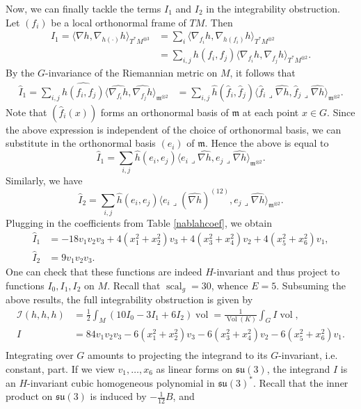 \documentclass[12pt]{scrartcl}
\theoremstyle{plain}
\theoremstyle{definition}
\newcommand{\scal}{\operatorname{scal}}%
\newcommand{\vol}{\operatorname{vol}}%
\newcommand{\Vol}{\operatorname{Vol}}%
\newcommand{\su}{\mathfrak{su}}%
\newcommand{\m}{\mathfrak{m}}%
\newcommand{\Einstein}{E}%
\begin{document}
Now, we can finally tackle the terms $I_1$ and $I_2$ in the integrability obstruction. Let $(f_i)$ be a local orthonormal frame of $TM$. Then
\begin{align*}
I_1=\langle\nabla h,\nabla_{h(\cdot)}h\rangle_{T^\ast M^{\otimes 3}}&=\sum_i\langle\nabla_{f_i}h,\nabla_{h(f_i)}h\rangle_{T^\ast M^{\otimes 2}}\\
&=\sum_{i,j}h(f_i,f_j)\langle\nabla_{f_i}h,\nabla_{f_j}h\rangle_{T^\ast M^{\otimes 2}}.
\end{align*}
By the $G$-invariance of the Riemannian metric on $M$, it follows that
\begin{align*}
\hat I_1=\sum_{i,j}\widehat{h(f_i,f_j)}\langle\widehat{\nabla_{f_i}h},\widehat{\nabla_{f_j}h}\rangle_{\m^{\otimes 2}}&=\sum_{i,j}\hat h(\hat f_i, \hat f_j)\langle\hat f_i\lrcorner\widehat{\nabla h},\hat f_j\lrcorner\widehat{\nabla h}\rangle_{\m^{\otimes 2}}.
\end{align*}
Note that $(\hat f_i(x))$ forms an orthonormal basis of $\m$ at each point $x\in G$. Since the above expression is independent of the choice of orthonormal basis, we can substitute in the orthonormal basis $(e_i)$ of $\m$. Hence the above is equal to
\[\hat I_1=\sum_{i,j}\hat h(e_i,e_j)\langle e_i\lrcorner\widehat{\nabla h},e_j\lrcorner\widehat{\nabla h}\rangle_{\m^{\otimes 2}}.\]
Similarly, we have
\[\hat I_2=\sum_{i,j}\hat h(e_i,e_j)\langle e_i\lrcorner(\widehat{\nabla h})^{(12)},e_j\lrcorner\widehat{\nabla h}\rangle_{\m^{\otimes 2}}.\]
Plugging in the coefficients from Table \ref{nablahcoef}, we obtain
\begin{align*}
\hat I_1&=-18v_1v_2v_3+4(x_1^2+x_2^2)v_3+4(x_3^2+x_4^2)v_2+4(x_5^2+x_6^2)v_1,\\
\hat I_2&=9v_1v_2v_3.
\end{align*}
One can check that these functions are indeed $H$-invariant and thus project to functions $I_0,I_1,I_2$ on $M$. Recall that $\scal_g=30$, whence $\Einstein=5$. Subsuming the above results, the full integrability obstruction is given by
\begin{align*}
\mathcal{I}(h,h,h)&=\frac{1}{2}\int_M(10I_0-3I_1+6I_2)\vol=\frac{1}{\Vol(K)}\int_GI\vol,\\
I&=84v_1v_2v_3-6(x_1^2+x_2^2)v_3-6(x_3^2+x_4^2)v_2-6(x_5^2+x_6^2)v_1.\\
\end{align*}
Integrating over $G$ amounts to projecting the integrand to its $G$-invariant, i.e. constant, part. If we view $v_1,\ldots,x_6$ as linear forms on $\su(3)$, the integrand $I$
is an $H$-invariant cubic homogeneous polynomial in $\su(3)^\ast$. Recall that the inner product on $\su(3)$ is induced by $-\frac{1}{12}B$, and
\end{document}
